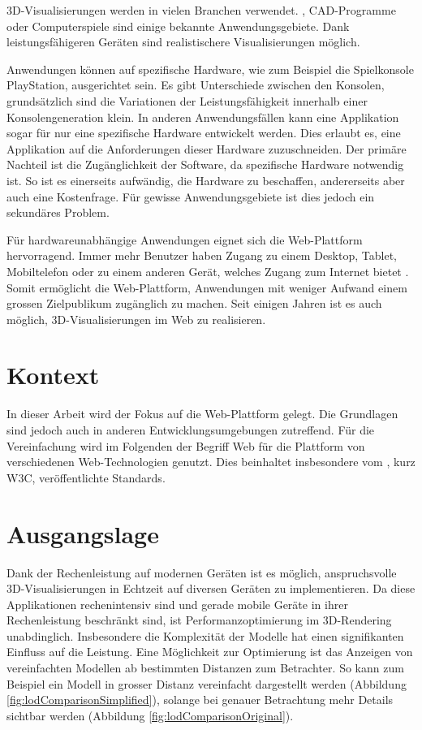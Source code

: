 
3D-Visualisierungen werden in vielen Branchen verwendet. , CAD-Programme oder Computerspiele sind einige bekannte Anwendungsgebiete. Dank leistungsfähigeren Geräten sind realistischere Visualisierungen möglich.

Anwendungen können auf spezifische Hardware, wie zum Beispiel die Spielkonsole PlayStation, ausgerichtet sein. Es gibt Unterschiede zwischen den Konsolen, grundsätzlich sind die Variationen der Leistungsfähigkeit innerhalb einer Konsolengeneration klein. In anderen Anwendungsfällen kann eine Applikation sogar für nur eine spezifische Hardware entwickelt werden. Dies erlaubt es, eine Applikation auf die Anforderungen dieser Hardware zuzuschneiden. Der primäre Nachteil ist die Zugänglichkeit der Software, da spezifische Hardware notwendig ist. So ist es einerseits aufwändig, die Hardware zu beschaffen, andererseits aber auch eine Kostenfrage. Für gewisse Anwendungsgebiete ist dies jedoch ein sekundäres Problem.

Für hardwareunabhängige Anwendungen eignet sich die Web-Plattform hervorragend.
Immer mehr Benutzer haben Zugang zu einem Desktop, Tablet, Mobiltelefon oder zu einem anderen Gerät, welches Zugang zum Internet bietet \cite{peopleWithInternetAccess}.
Somit ermöglicht die Web-Plattform, Anwendungen mit weniger Aufwand einem grossen Zielpublikum zugänglich zu machen.
Seit einigen Jahren ist es auch möglich, 3D-Visualisierungen im Web zu realisieren.

\section{Kontext}
In dieser Arbeit wird der Fokus auf die Web-Plattform gelegt. Die Grundlagen sind jedoch auch in anderen Entwicklungsumgebungen zutreffend.
Für die Vereinfachung wird im Folgenden der Begriff Web für die Plattform von verschiedenen Web-Technologien genutzt. Dies beinhaltet insbesondere vom , kurz W3C, veröffentlichte Standards.

\section{Ausgangslage}
Dank der Rechenleistung auf modernen Geräten ist es möglich, anspruchsvolle 3D-Visualisierungen in Echtzeit auf diversen Geräten zu implementieren. Da diese Applikationen rechenintensiv sind und gerade mobile Geräte in ihrer Rechenleistung beschränkt sind, ist Performanzoptimierung im 3D-Rendering unabdinglich. Insbesondere die Komplexität der Modelle hat einen signifikanten Einfluss auf die Leistung.
Eine Möglichkeit zur Optimierung ist das Anzeigen von vereinfachten Modellen ab bestimmten Distanzen zum Betrachter. So kann zum Beispiel ein Modell in grosser Distanz vereinfacht dargestellt werden (Abbildung \ref{fig:lodComparisonSimplified}), solange bei genauer Betrachtung mehr Details sichtbar werden (Abbildung \ref{fig:lodComparisonOriginal}).

